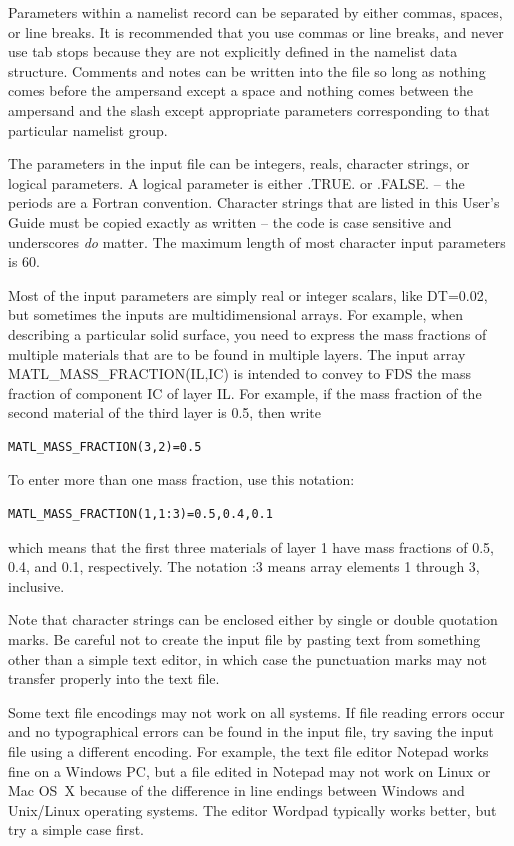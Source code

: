 \documentclass[11pt]{book}
\begin{document}
Parameters within a namelist record can be separated by either commas, spaces, or line breaks. It is recommended that you use commas or line breaks, and never use tab stops because they are not explicitly defined in the namelist data structure. Comments and notes can be written into the file so long as nothing comes before the ampersand except a space and nothing comes between the ampersand and the slash except appropriate parameters corresponding to that particular namelist group.

The parameters in the input file can be integers, reals, character strings, or logical parameters. A logical parameter is either {\ct .TRUE.} or {\ct .FALSE.} -- the periods are a Fortran convention. Character strings that are listed in this User's Guide must be copied exactly as written -- the code is case sensitive and underscores {\em do} matter. The maximum length of most character input parameters is 60.

Most of the input parameters are simply real or integer scalars, like {\ct DT=0.02}, but sometimes the inputs are
multidimensional arrays. For example, when describing a particular solid surface, you need to express the mass fractions of multiple materials that are to be found in multiple layers. The input array {\ct MATL\_MASS\_FRACTION(IL,IC)} is intended to convey to FDS the mass fraction of component {\ct IC} of layer {\ct IL}. For example, if the mass fraction of the second material of the third layer is 0.5, then write
\begin{lstlisting}
MATL_MASS_FRACTION(3,2)=0.5
\end{lstlisting}
To enter more than one mass fraction, use this notation:
\begin{lstlisting}
MATL_MASS_FRACTION(1,1:3)=0.5,0.4,0.1
\end{lstlisting}
which means that the first three materials of layer 1 have mass fractions of 0.5, 0.4, and 0.1, respectively. The notation {:3} means array elements 1 through 3, inclusive.

Note that character strings can be enclosed either by single or double quotation marks. Be careful not to create the input file by pasting text from something other than a simple text editor, in which case the punctuation marks may not transfer properly into the text file.

Some text file encodings may not work on all systems. If file reading errors occur and no typographical errors can be found in the input file, try saving the input file using a different encoding. For example, the text file editor Notepad works fine on a Windows PC, but a file edited in Notepad may not work on Linux or Mac OS~X because of the difference in line endings between Windows and Unix/Linux operating systems. The editor Wordpad typically works better, but try a simple case first.
\end{document}
